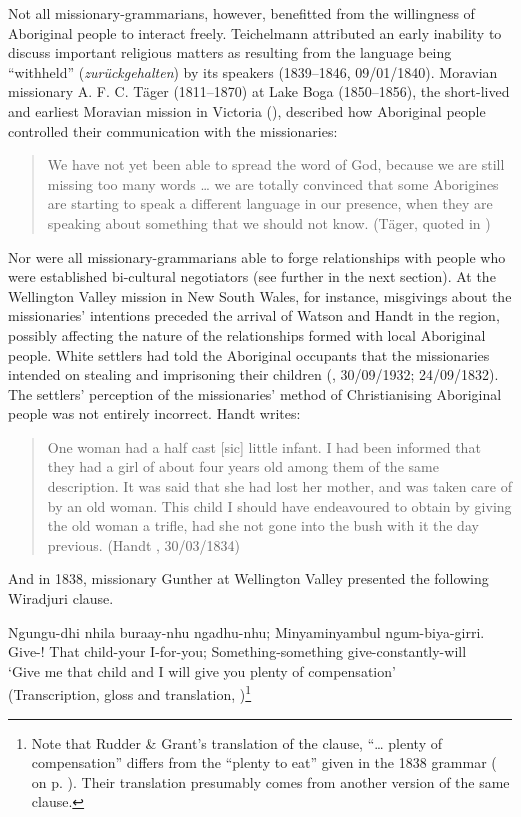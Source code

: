 Not all missionary-grammarians, however, benefitted from the willingness of Aboriginal people to interact freely. Teichelmann attributed an early inability to discuss important religious matters as resulting from the language being “withheld” (\textit{zurückgehalten}) by its speakers (1839--1846, 09/01/1840). Moravian missionary A. F. C. Täger (1811--1870) at Lake Boga (1850--1856), the short-lived and earliest Moravian mission in Victoria (), described how Aboriginal people controlled their communication with the missionaries:

\begin{quote}
    We have not yet been able to spread the word of God, because we are still missing too many words … we are totally convinced that some Aborigines are starting to speak a different language in our presence, when they are speaking about something that we should not know. (Täger, quoted in \citealt[81]{jensz_german_2010})
\end{quote}

Nor were all missionary-grammarians able to forge relationships with people who were established bi-cultural negotiators (see further in the next section). At the Wellington Valley mission in New South Wales, for instance, misgivings about the missionaries’ intentions preceded the arrival of Watson and Handt in the region, possibly affecting the nature of the relationships formed with local Aboriginal people. White settlers had told the Aboriginal occupants that the missionaries intended on stealing and imprisoning their children (\citealt{handtpapers}, 30/09/1932; 24/09/1832). The settlers’ perception of the missionaries’ method of Christianising Aboriginal people was not entirely incorrect. Handt writes:

\begin{quote}
    One woman had a half cast [sic] little infant. I had been informed that they had a girl of about four years old among them of the same description. It was said that she had lost her mother, and was taken care of by an old woman. This child I should have endeavoured to obtain by giving the old woman a trifle, had she not gone into the bush with it the day previous. (Handt \citeyear{handtpapers}, 30/03/1834)
\end{quote}

And in 1838, missionary Gunther at Wellington Valley presented the following Wiradjuri clause. 

\ea \label{ex:1:2}
\gll Ngungu-dhi nhila buraay-nhu ngadhu-nhu; Minyaminyambul ngum-biya-girri. \\
Give-! That child-your I-for-you; Something-something give-constantly-will\\
\glt `Give me that child and I will give you plenty of compensation' \\
(Transcription, gloss and translation, \citealt[39]{grant_introducing_2000})\footnote{Note that Rudder \& Grant’s translation of the clause, “… plenty of compensation” differs from the ``plenty to eat'' given in the 1838 grammar ( on p. \pageref{tab:chap3:ergativepm}). Their translation presumably comes from another version of the same clause.}
\z 

